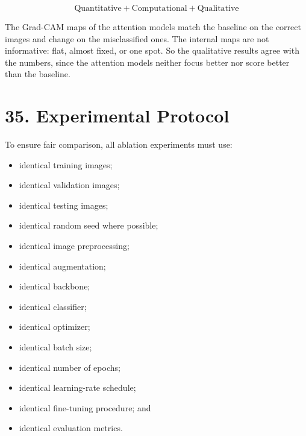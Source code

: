 \documentclass[10pt]{article}
\begin{document}
\[
\boxed{
\text{Quantitative}
+
\text{Computational}
+
\text{Qualitative}
}
\]

The Grad-CAM maps of the attention models match the baseline on the correct images and change on the misclassified ones. The internal maps are not informative: flat, almost fixed, or one spot. So the qualitative results agree with the numbers, since the attention models neither focus better nor score better than the baseline.

\section*{35. Experimental Protocol}

To ensure fair comparison, all ablation experiments must use:

\begin{itemize}

\item identical training images;

\item identical validation images;

\item identical testing images;

\item identical random seed where possible;

\item identical image preprocessing;

\item identical augmentation;

\item identical backbone;

\item identical classifier;

\item identical optimizer;

\item identical batch size;

\item identical number of epochs;

\item identical learning-rate schedule;

\item identical fine-tuning procedure; and

\item identical evaluation metrics.

\end{itemize}
\end{document}
